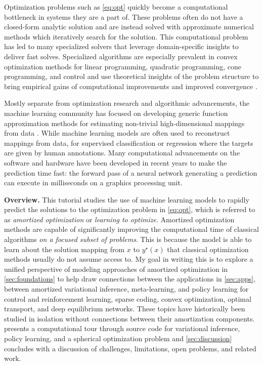 Optimization problems such as \cref{eq:opt} quickly become a
computational bottleneck in systems they are a part of.
These problems often do not have a closed-form
analytic solution and are instead solved with
approximate numerical methods which iteratively
search for the solution.
This computational problem has led to many specialized
solvers that leverage domain-specific insights to
deliver fast solves.
Specialized algorithms are
especially prevalent in convex optimization methods for
linear programming, quadratic programming, cone programming,
and control and use theoretical insights of the problem
structure to bring empirical gains of computational
improvements and improved convergence
\citep{boyd2004convex,nocedal2006numerical,bertsekas2015convex,bubeck2015convex,nesterov2018lectures}.

Mostly separate from optimization research and algorithmic advancements,
the machine learning community has focused on developing
generic function approximation methods for estimating non-trivial
high-dimensional mappings from data
\citep{murphy2012machine,goodfellow2016deep,deisenroth2020mathematics}.
While machine learning models are often used to reconstruct mappings
from data, \eg for supervised classification or regression where
the targets are given by human annotations.
Many computational advancements on the software and hardware
have been developed in recent years to make the prediction time fast:
the forward pass of a neural network generating a prediction
can execute in milliseconds on a graphics processing unit.

\textbf{Overview.}
This tutorial studies the use of machine learning models to
rapidly predict the solutions to the optimization problem in
\cref{eq:opt}, which is referred to as
\emph{amortized optimization} or \emph{learning to optimize}.
Amortized optimization methods are capable of significantly
improving the computational time of
classical algorithms \emph{on a focused subset of problems}.
This is because the model is able to learn about the
solution mapping from $x$ to $y^\star(x)$ that classical
optimization methods usually do not assume access to.
My goal in writing this is to explore a unified perspective
of modeling approaches of amortized optimization in
\cref{sec:foundations} to help draw connections
between the applications in \cref{sec:apps},
\eg between amortized variational inference, meta-learning,
and policy learning for control and reinforcement learning,
sparse coding, convex optimization, optimal transport,
and deep equilibrium networks.
These topics have historically been studied in isolation
without connections between their amortization components.
 presents a computational tour
through source code for variational inference, policy learning,
and a spherical optimization problem and
\cref{sec:discussion} concludes with a discussion of
challenges, limitations, open problems, and related work.

